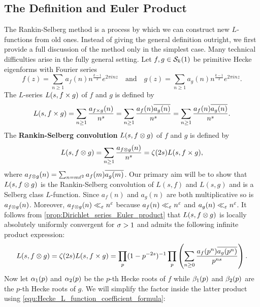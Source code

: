     \subsection*{The Definition and Euler Product}
      The Rankin-Selberg method is a process by which we can construct new $L$-functions from old ones. Instead of giving the general definition outright, we first provide a full discussion of the method only in the simplest case. Many technical difficulties arise in the fully general setting. Let $f,g \in \mathcal{S}_{k}(1)$ be primitive Hecke eigenforms with Fourier series
      \[
        f(z) = \sum_{n \ge 1}a_{f}(n)n^{\frac{k-1}{2}}e^{2\pi inz} \quad \text{and} \quad g(z) = \sum_{n \ge 1}a_{g}(n)n^{\frac{k-1}{2}}e^{2\pi inz}.
      \]
      The $L$-series $L(s,f \times g)$ of $f$ and $g$ is defined by
      \[
        L(s,f \times g) = \sum_{n \ge 1}\frac{a_{f \times g}(n)}{n^{s}} = \sum_{n \ge 1}\frac{a_{f}(n)\overline{a_{g}(n)}}{n^{s}} = \sum_{n \ge 1}\frac{a_{f}(n)\overline{a_{g}(n)}}{n^{s}}.
      \]
      The \textbf{Rankin-Selberg convolution} $L(s,f \otimes g)$ of $f$ and $g$ is defined by
      \[
        L(s,f \otimes g) = \sum_{n \ge 1}\frac{a_{f \otimes g}(n)}{n^{s}} = \zeta(2s)L(s,f \times g),
      \]
      where $a_{f \otimes g}(n) = \sum_{n = m\ell^{2}}a_{f}(m)\overline{a_{g}(m)}$. Our primary aim will be to show that $L(s,f \otimes g)$ is the Rankin-Selberg convolution of $L(s,f)$ and $L(s,g)$ and is a Selberg class $L$-function. Since $a_{f}(n)$ and $a_{g}(n)$ are both multiplicative so is $a_{f \otimes g}(n)$. Moreover, $a_{f \otimes g}(n) \ll_{\varepsilon} n^{\varepsilon}$ because $a_{f}(n) \ll_{\varepsilon} n^{\varepsilon}$ and $a_{g}(n) \ll_{\varepsilon} n^{\varepsilon}$. It follows from \cref{prop:Dirichlet_series_Euler_product} that $L(s,f \otimes g)$ is locally absolutely uniformly convergent for $\sigma > 1$ and admits the following infinite product expression:
      \[
        L(s,f \otimes g) = \zeta(2s)L(s,f \times g) = \prod_{p}(1-p^{-2s})^{-1}\prod_{p}\left(\sum_{n \ge 0}\frac{a_{f}(p^{n})\overline{a_{g}(p^{n})}}{p^{ns}}\right).
      \]
      Now let $\alpha_{1}(p)$ and $\alpha_{2}(p)$ be the $p$-th Hecke roots of $f$ while $\beta_{1}(p)$ and $\beta_{2}(p)$ are the $p$-th Hecke roots of $g$. We will simplify the factor inside the latter product using \cref{equ:Hecke_L_function_coefficient_formula}:
      \begingroup
      \allowdisplaybreaks
